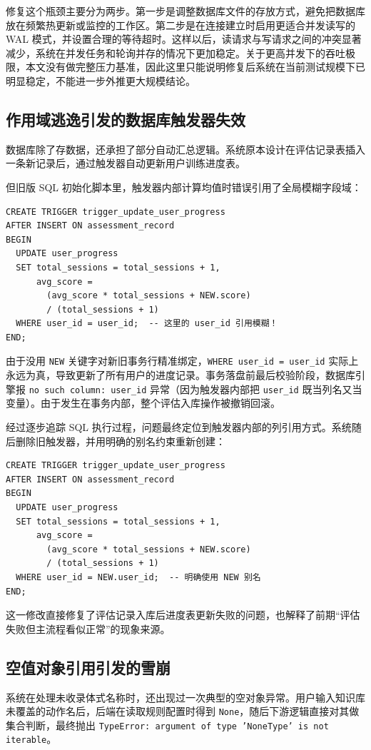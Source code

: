 修复这个瓶颈主要分为两步。第一步是调整数据库文件的存放方式，避免把数据库放在频繁热更新或监控的工作区。第二步是在连接建立时启用更适合并发读写的 WAL 模式，并设置合理的等待超时。这样以后，读请求与写请求之间的冲突显著减少，系统在并发任务和轮询并存的情况下更加稳定。关于更高并发下的吞吐极限，本文没有做完整压力基准，因此这里只能说明修复后系统在当前测试规模下已明显稳定，不能进一步外推更大规模结论。

\subsection{作用域逃逸引发的数据库触发器失效}
数据库除了存数据，还承担了部分自动汇总逻辑。系统原本设计在评估记录表插入一条新记录后，通过触发器自动更新用户训练进度表。

但旧版 SQL 初始化脚本里，触发器内部计算均值时错误引用了全局模糊字段域：
\begin{verbatim}
CREATE TRIGGER trigger_update_user_progress
AFTER INSERT ON assessment_record
BEGIN
  UPDATE user_progress 
  SET total_sessions = total_sessions + 1,
      avg_score =
        (avg_score * total_sessions + NEW.score)
        / (total_sessions + 1)
  WHERE user_id = user_id;  -- 这里的 user_id 引用模糊！
END;
\end{verbatim}
由于没用 \texttt{NEW} 关键字对新旧事务行精准绑定，\texttt{WHERE user\_id = user\_id} 实际上永远为真，导致更新了所有用户的进度记录。事务落盘前最后校验阶段，数据库引擎报 \texttt{no such column: user\_id} 异常（因为触发器内部把 \texttt{user\_id} 既当列名又当变量）。由于发生在事务内部，整个评估入库操作被撤销回滚。

经过逐步追踪 SQL 执行过程，问题最终定位到触发器内部的列引用方式。系统随后删除旧触发器，并用明确的别名约束重新创建：
\begin{verbatim}
CREATE TRIGGER trigger_update_user_progress
AFTER INSERT ON assessment_record
BEGIN
  UPDATE user_progress 
  SET total_sessions = total_sessions + 1,
      avg_score =
        (avg_score * total_sessions + NEW.score)
        / (total_sessions + 1)
  WHERE user_id = NEW.user_id;  -- 明确使用 NEW 别名
END;
\end{verbatim}
这一修改直接修复了评估记录入库后进度表更新失败的问题，也解释了前期“评估失败但主流程看似正常”的现象来源。

\subsection{空值对象引用引发的雪崩}
系统在处理未收录体式名称时，还出现过一次典型的空对象异常。用户输入知识库未覆盖的动作名后，后端在读取规则配置时得到 \texttt{None}，随后下游逻辑直接对其做集合判断，最终抛出 \texttt{TypeError: argument of type 'NoneType' is not iterable}。

